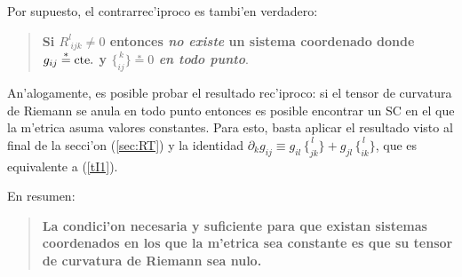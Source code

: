 Por supuesto, el contrarrec'iproco es tambi'en verdadero:
\begin{quotation}
\textbf{Si $R_{\ ijk}^l\neq0$
entonces \textit{no existe} un sistema coordenado donde $g_{ij}\overset{\ast}{=}{\rm
cte.}$ y $\{ _{ i j}^{\, k}\} \overset{\ast}{=}0$ \textit{en todo punto}}.
\end{quotation}

An'alogamente, es posible probar el resultado rec'iproco: si el tensor de curvatura de Riemann se anula en todo punto entonces es posible encontrar un SC en el que la m'etrica asuma valores constantes. Para esto, basta aplicar el resultado visto al final de la secci'on (\ref{sec:RT}) y la identidad $\partial_kg_{ij}\equiv g_{il}\,\{ ^{\, l} _{jk}\}+g_{jl}\,\{ ^{\, l} _{ik}\}$, que es equivalente a (\ref{tI1}).

En resumen:
\begin{quotation}
\textbf{La condici'on necesaria y suficiente para que existan sistemas coordenados en los que la m'etrica sea constante es que su tensor de curvatura de Riemann sea nulo.}
\end{quotation}
%

